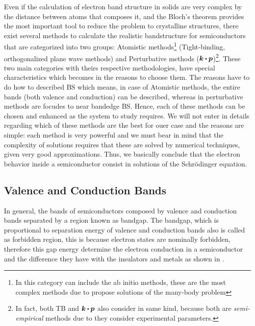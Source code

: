 Even if the calculation of electron band structure in solids are very complex by the distance between atoms that composes it, and the Bloch's theorem provides the most important tool to reduce the problem to crystalline structures, there exist several methods to  calculate the realistic bandstructure for semiconductors that are categorized into two groups: Atomistic methods\footnote{In this category can include the ab initio methods, these are the most complex methods due to propose  solutions of the many-body problem} (Tight-binding, orthogonalized plane wave methods) and Perturbative methods ($\boldsymbol{k}\bigcdot \boldsymbol{p}$)\footnote{In fact, both TB and $\boldsymbol{k}\bigcdot \boldsymbol{p}$ also consider in same kind, because both are \emph{semi-empirical} methods due to they consider experimental parameters.}. 
These two main categories with theirs respective methodologies, have special characteristics which becomes in the reasons to choose them. The reasons have to do how to  described \gls{BS} which means, in case of Atomistic methods, the entire bands  (both valence and conduction) can be described, whereas in perturbative methods are focudes to near bandedge \gls{BS}. Hence, each of these methods can be chosen and enhanced as the system to study requires. 
We will not enter in details regarding  which of these methods are the best for ouer case and the reasons are simple: each method is very powerful and we must bear in mind that the complexity of solutions requires that these are solved by numerical techniques, given very good approximations. 
Thus, we basically conclude that the electron behavior inside a semiconductor consist in solutions of the Schrödinger equation\cite{boer2018semiconductor}.  
\subsection{Valence and Conduction Bands}
\label{subsec:chapter-1-valence-and-conduction-bands}
\vspace{-10mm}
In general,  the bands of semiconductors composed by valence and conduction bands separated by a  region known as bandgap. 
The bandgap, which is proportional to separation energy of valence and conduction bands also is called as forbidden region, this is because electron states are nominally forbidden, therefore this gap energy determine the electron conduction in a semiconductor and the difference they have with the insulators and metals as shown in .  

